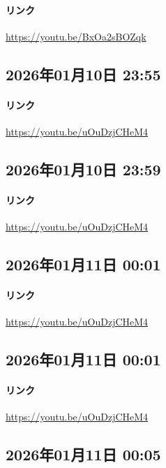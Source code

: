 \paragraph{リンク}
\url{https://youtu.be/BxOa2sBOZqk}

\subsection*{2026年01月10日 23:55}

\paragraph{リンク}
\url{https://youtu.be/uOuDzjCHeM4}

\subsection*{2026年01月10日 23:59}

\paragraph{リンク}
\url{https://youtu.be/uOuDzjCHeM4}

\subsection*{2026年01月11日 00:01}

\paragraph{リンク}
\url{https://youtu.be/uOuDzjCHeM4}

\subsection*{2026年01月11日 00:01}

\paragraph{リンク}
\url{https://youtu.be/uOuDzjCHeM4}

\subsection*{2026年01月11日 00:05}

